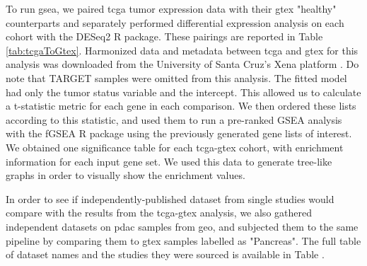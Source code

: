 To run \gls{gsea}, we paired \gls{tcga} tumor expression data with their \gls{gtex} "healthy" counterparts and separately performed differential expression analysis on each cohort with the DESeq2 R package. These pairings are reported in Table \ref{tab:tcgaToGtex}. Harmonized data and metadata between \gls{tcga} and \gls{gtex} for this analysis was downloaded from the University of Santa Cruz's Xena platform \cite{UCSCXena}. Do note that TARGET samples were omitted from this analysis. %
The fitted model had only the tumor status variable and the intercept. This allowed us to calculate a t-statistic metric for each gene in each comparison. We then ordered these lists according to this statistic, and used them to run a pre-ranked GSEA analysis with the fGSEA R package \cite{korotkevichFastGeneSet2021} using the previously generated gene lists of interest.
We obtained one significance table for each \gls{tcga}-\gls{gtex} cohort, with enrichment information for each input gene set. We used this data to generate tree-like graphs in order to visually show the enrichment values.

In order to see if independently-published dataset from single studies would compare with the results from the \gls{tcga}-\gls{gtex} analysis, we also gathered  independent datasets on \gls{pdac} samples from \gls{geo}, and subjected them to the same pipeline by comparing them to \gls{gtex} samples labelled as "Pancreas". The full table of dataset names and the studies they were sourced is available in Table .

